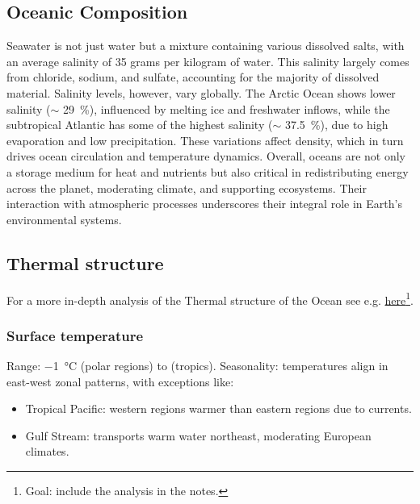 \subsection{Oceanic Composition}\label{subsec:ocean-composition}
Seawater is not just water but a mixture containing various dissolved salts, with an average salinity of 35 grams per kilogram of water. This salinity largely comes from chloride, sodium, and sulfate, accounting for the majority of dissolved material. Salinity levels, however, vary globally. The Arctic Ocean shows lower salinity ($\sim$ \qty{29}{\percent}),
influenced by melting ice and freshwater inflows, while the subtropical Atlantic has some of the highest salinity ($\sim$ \qty{37.5}{\percent}), due to high evaporation and low precipitation. These variations affect density, which in turn drives ocean circulation and temperature dynamics.
Overall, oceans are not only a storage medium for heat and nutrients but also critical in redistributing energy across the planet, moderating climate, and supporting ecosystems. Their interaction with atmospheric processes underscores their integral role in Earth's environmental systems.

\subsection{Thermal structure}\label{subsec:temperature-profile}

For a more in-depth analysis of the Thermal structure of the Ocean see e.g. \href{https://wanderer.cmcc.it/chp65chap.html#the-thermal-structure-of-the-ocean}{here}\footnote{Goal: include the analysis in the notes.}.
\subsubsection{Surface temperature}
Range: \qty{-1}{\celsius} (polar regions) to  (tropics).
Seasonality: temperatures align in east-west zonal patterns, with exceptions like:
\begin{itemize}
	\item Tropical Pacific: western regions warmer than eastern regions due to currents.
	\item Gulf Stream: transports warm water northeast, moderating European climates.
\end{itemize}


